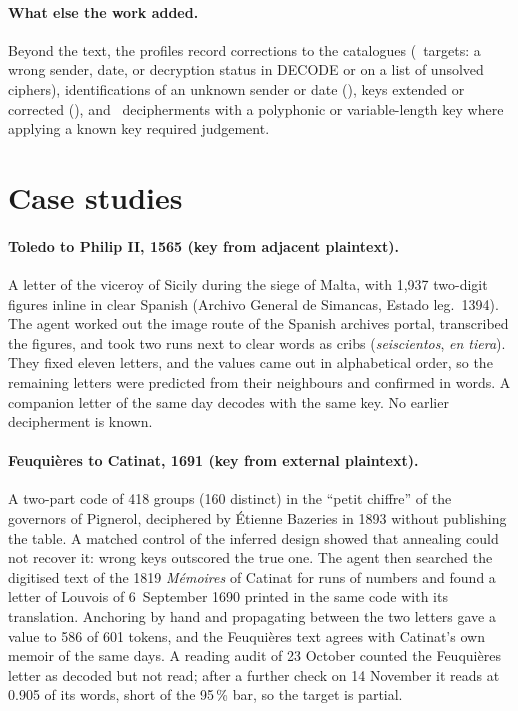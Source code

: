 \documentclass[11pt]{article}
\begin{document}
\paragraph{What else the work added.} Beyond the text, the profiles record corrections to the catalogues (\Ncatcorr\ targets: a wrong sender, date, or decryption status in DECODE or on a list of unsolved ciphers), identifications of an unknown sender or date (\Nsenderid), keys extended or corrected (\Nkeyextended), and \Nambiguous\ decipherments with a polyphonic or variable-length key where applying a known key required judgement.

\section{Case studies}
\label{sec:cases}

\paragraph{Toledo to Philip II, 1565 (key from adjacent plaintext).} A letter of the viceroy of Sicily during the siege of Malta, with 1,937 two-digit figures inline in clear Spanish (Archivo General de Simancas, Estado leg.~1394). The agent worked out the image route of the Spanish archives portal, transcribed the figures, and took two runs next to clear words as cribs (\emph{seiscientos}, \emph{en tiera}). They fixed eleven letters, and the values came out in alphabetical order, so the remaining letters were predicted from their neighbours and confirmed in words. A companion letter of the same day decodes with the same key. No earlier decipherment is known.

\paragraph{Feuqui\`eres to Catinat, 1691 (key from external plaintext).} A two-part code of 418 groups (160 distinct) in the ``petit chiffre'' of the governors of Pignerol, deciphered by \'Etienne Bazeries in 1893 without publishing the table. A matched control of the inferred design showed that annealing could not recover it: wrong keys outscored the true one. The agent then searched the digitised text of the 1819 \emph{M\'emoires} of Catinat for runs of numbers and found a letter of Louvois of 6~September 1690 printed in the same code with its translation. Anchoring by hand and propagating between the two letters gave a value to 586 of 601 tokens, and the Feuqui\`eres text agrees with Catinat's own memoir of the same days. A reading audit of 23 October counted the Feuqui\`eres letter as decoded but not read; after a further check on 14 November it reads at 0.905 of its words, short of the 95\,\% bar, so the target is partial.
\end{document}
